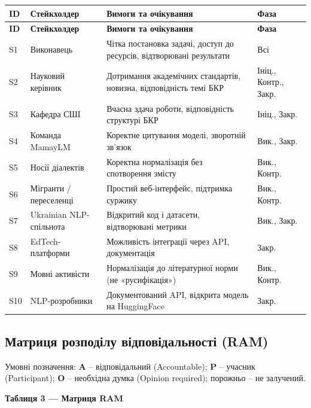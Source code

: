 \documentclass[14pt]{extarticle}
\newcommand{\tabhead}[1]{\textbf{#1}}
\begin{document}
\begin{longtable}{|p{}|p{}|p{}|p{}|}
\hline
\tabhead{ID} & \tabhead{Стейкхолдер} & \tabhead{Вимоги та очікування} & \tabhead{Фаза} \\
\hline
\endfirsthead
\hline
\tabhead{ID} & \tabhead{Стейкхолдер} & \tabhead{Вимоги та очікування} & \tabhead{Фаза} \\
\hline
\endhead
S1 & Виконавець & Чітка постановка задачі, доступ до ресурсів, відтворювані результати & Всі \\
\hline
S2 & Науковий керівник & Дотримання академічних стандартів, новизна, відповідність темі БКР & Ініц., Контр., Закр. \\
\hline
S3 & Кафедра СШІ & Вчасна здача роботи, відповідність структурі БКР & Ініц., Закр. \\
\hline
S4 & Команда MamayLM & Коректне цитування моделі, зворотній зв'язок & Вик., Закр. \\
\hline
S5 & Носії діалектів & Коректна нормалізація без спотворення змісту & Вик., Контр. \\
\hline
S6 & Мігранти / переселенці & Простий веб-інтерфейс, підтримка суржику & Вик., Контр. \\
\hline
S7 & Ukrainian NLP-спільнота & Відкритий код і датасети, відтворювані метрики & Вик., Закр. \\
\hline
S8 & EdTech-платформи & Можливість інтеграції через API, документація & Закр. \\
\hline
S9 & Мовні активісти & Нормалізація до літературної норми (не «русифікація») & Вик., Контр. \\
\hline
S10 & NLP-розробники & Документований API, відкрита модель на HuggingFace & Закр. \\
\hline
\end{longtable}

\subsection{Матриця розподілу відповідальності (RAM)}

Умовні позначення: \textbf{A} -- відповідальний (Accountable); \textbf{P} -- учасник (Participant); \textbf{O} -- необхідна думка (Opinion required); порожньо -- не залучений.

\vspace{6pt}
\noindent\textbf{Таблиця 3 --- Матриця RAM}
\end{document}
